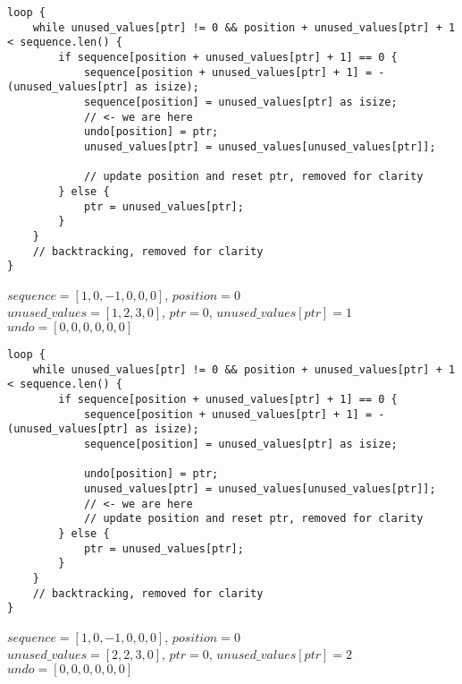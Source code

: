 \begin{frame}[fragile]
    \begin{verbatim}
loop {
    while unused_values[ptr] != 0 && position + unused_values[ptr] + 1 < sequence.len() {
        if sequence[position + unused_values[ptr] + 1] == 0 {
            sequence[position + unused_values[ptr] + 1] = -(unused_values[ptr] as isize);
            sequence[position] = unused_values[ptr] as isize;
            // <- we are here
            undo[position] = ptr;
            unused_values[ptr] = unused_values[unused_values[ptr]];
            
            // update position and reset ptr, removed for clarity
        } else {
            ptr = unused_values[ptr];
        }
    }
    // backtracking, removed for clarity
}
    \end{verbatim}
    $sequence = [1, 0, -1, 0, 0, 0]$, $position = 0$\\
    $unused\_values = [1, 2, 3, 0]$, $ptr = 0$, $unused\_values[ptr] = 1$\\
    $undo = [0, 0, 0, 0, 0, 0]$
\end{frame}
\begin{frame}[fragile]
    \begin{verbatim}
loop {
    while unused_values[ptr] != 0 && position + unused_values[ptr] + 1 < sequence.len() {
        if sequence[position + unused_values[ptr] + 1] == 0 {
            sequence[position + unused_values[ptr] + 1] = -(unused_values[ptr] as isize);
            sequence[position] = unused_values[ptr] as isize;

            undo[position] = ptr;
            unused_values[ptr] = unused_values[unused_values[ptr]];
            // <- we are here
            // update position and reset ptr, removed for clarity
        } else {
            ptr = unused_values[ptr];
        }
    }
    // backtracking, removed for clarity
}
    \end{verbatim}
    $sequence = [1, 0, -1, 0, 0, 0]$, $position = 0$\\
    $unused\_values = [2, 2, 3, 0]$, $ptr = 0$, $unused\_values[ptr] = 2$\\
    $undo = [0, 0, 0, 0, 0, 0]$
\end{frame}
